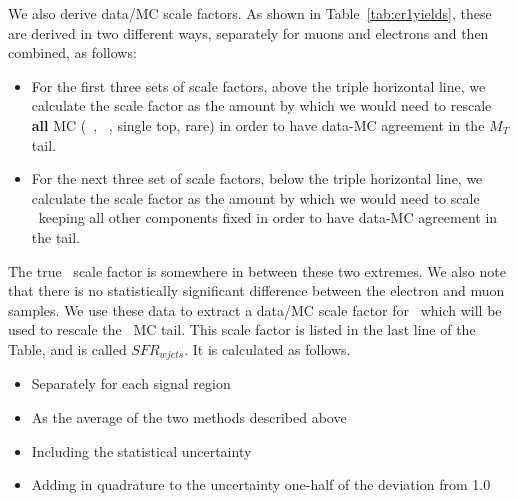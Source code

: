 We also derive data/MC scale factors.
As shown in Table~\ref{tab:cr1yields}, these are derived in two different ways, separately for muons and
electrons and then combined, as follows:
\begin{itemize}
\item For the first three sets of scale factors, above the triple horizontal
  line, we calculate the scale factor as the amount by which we would
  need to rescale {\bf all} MC (\wjets\ , \ttbar\ , single top, rare) in
  order to have data-MC agreement in the $M_T$ tail.
\item For the next three set of scale factors, below the triple horizontal
line, we calculate the scale factor as the amount by which we would
need 
to scale \wjets\ keeping all other 
components fixed in order to have data-MC agreement in the tail.
\end{itemize}
\noindent  The true \wjets\ scale factor is somewhere in between these
two extremes.  We also note that there is no statistically significant
difference between the electron and muon samples.  We use these data
to extract a data/MC scale factor for \wjets\ which will be used to
rescale the \wjets\ MC tail.  This scale factor is listed in the last
line of the Table, and is called $SFR_{wjets}$.  It is calculated as
follows.
\begin{itemize}
\item Separately for each signal region
\item As the average of the two methods described above
\item Including the statistical uncertainty
\item Adding in quadrature to the uncertainty one-half of the
  deviation from 1.0
\end{itemize}

 




